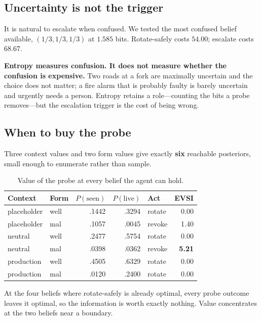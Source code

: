 \documentclass{article}
\begin{document}
\subsection{Uncertainty is not the trigger}

It is natural to escalate when confused. We tested the most confused belief
available, $(1/3,1/3,1/3)$ at $1.585$ bits. Rotate-safely costs $54.00$;
escalate costs $68.67$.

\textbf{Entropy measures confusion. It does not measure whether the confusion is
expensive.} Two roads at a fork are maximally uncertain and the choice does not
matter; a fire alarm that is probably faulty is barely uncertain and urgently
needs a person. Entropy retains a role---counting the bits a probe removes---but
the escalation trigger is the cost of being wrong.

\subsection{When to buy the probe}

Three context values and two form values give exactly \textbf{six} reachable
posteriors, small enough to enumerate rather than sample.

\begin{table}[t]
\centering
\small
\begin{tabular}{llrrlr}
\toprule
\textbf{Context} & \textbf{Form} & $P(\text{seen})$ & $P(\text{live})$ & \textbf{Act} & \textbf{EVSI} \\
\midrule
placeholder & well & .1442 & .3294 & rotate & 0.00 \\
placeholder & mal & .1057 & .0045 & revoke & 1.40 \\
neutral & well & .2477 & .5754 & rotate & 0.00 \\
neutral & mal & .0398 & .0362 & revoke & \textbf{5.21} \\
production & well & .4505 & .6329 & rotate & 0.00 \\
production & mal & .0120 & .2400 & rotate & 0.00 \\
\bottomrule
\end{tabular}
\caption{Value of the probe at every belief the agent can hold.}
\label{tab:evsi}
\end{table}

At the four beliefs where rotate-safely is already optimal, every probe outcome
leaves it optimal, so the information is worth exactly nothing. Value
concentrates at the two beliefs near a boundary.
\end{document}
